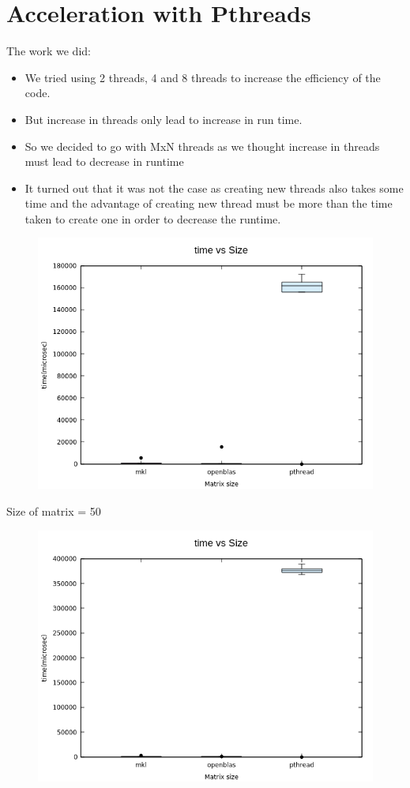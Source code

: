 \documentclass[14pt]{extarticle}
\begin{document}
\section{Acceleration with Pthreads}
The work we did:
\begin{itemize}
\item We tried using 2 threads, 4 and 8 threads to increase the efficiency of the code. 
\item But increase in threads only lead to increase in run time. 
\item So we decided to go with MxN threads as we thought increase in threads must lead to decrease in runtime
\item It turned out that it was not the case as creating new threads also takes some time and the advantage of creating new thread must be more than the time taken to create one in order to decrease the runtime.
\end{itemize}
\newpage
\begin{figure}[t]
\centering
\includegraphics[width=16cm]{50x3withpthread.png}
\end{figure}
Size of matrix = 50 
\newpage
\begin{figure}[t]
\centering
\includegraphics[width=16cm]{75x3withpthread.png}
\end{figure}
\end{document}
